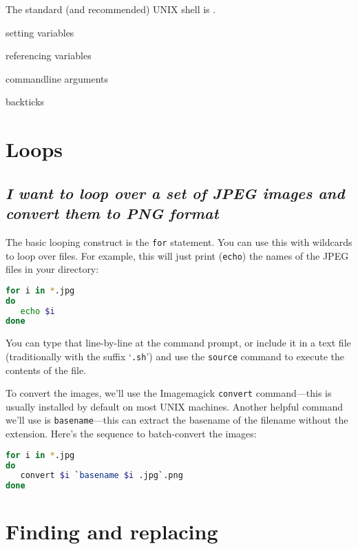 The standard (and recommended) UNIX shell is \bash.

setting variables

referencing variables

commandline arguments

backticks

\section{Loops}

\subsection{\em I want to loop over a set of JPEG images and convert them to PNG format}

The basic looping construct is the {\tt for} statement.  You can use this with wildcards to
loop over files.  For example, this will just print ({\tt echo}) the names of the JPEG
files in your directory:

\begin{lstlisting}[language={bash},upquote=true]
for i in *.jpg
do
   echo $i
done
\end{lstlisting}

You can type that line-by-line at the command prompt, or include it in
a text file (traditionally with the suffix `{\tt .sh}') and use the
{\tt source} command to execute the contents of the file.

To convert the images, we'll use the Imagemagick {\tt convert}
command---this is usually installed by default on most UNIX machines.
Another helpful command we'll use is {\tt basename}---this can extract
the basename of the filename without the extension.  Here's the
sequence to batch-convert the images:

\begin{lstlisting}[language={bash}]
for i in *.jpg
do
   convert $i `basename $i .jpg`.png
done
\end{lstlisting}







\section{Finding and replacing}




